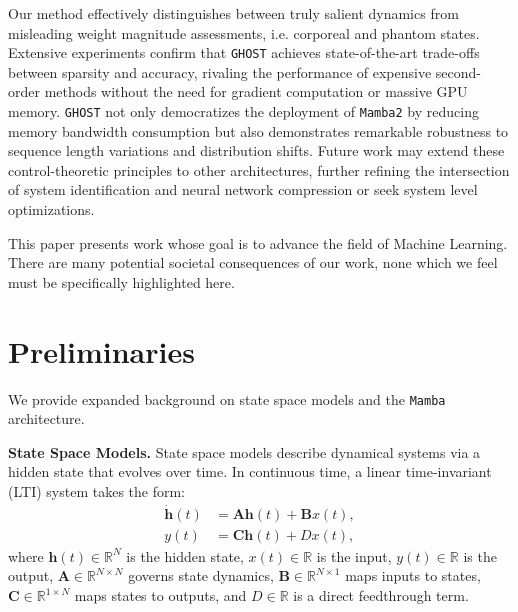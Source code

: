 \documentclass{article}
\theoremstyle{plain}
\theoremstyle{definition}
\theoremstyle{remark}
\begin{document}
Our method effectively distinguishes between truly salient dynamics from misleading weight magnitude assessments, i.e. corporeal and phantom states. Extensive experiments confirm that \texttt{GHOST} achieves state-of-the-art trade-offs between sparsity and accuracy, rivaling the performance of expensive second-order methods without the need for gradient computation or massive GPU memory. \texttt{GHOST} not only democratizes the deployment of \texttt{Mamba2} by reducing memory bandwidth consumption but also demonstrates remarkable robustness to sequence length variations and distribution shifts. Future work may extend these control-theoretic principles to other architectures, further refining the intersection of system identification and neural network compression or seek system level optimizations.


This paper presents work whose goal is to advance the field of Machine
Learning. There are many potential societal consequences of our work, none
which we feel must be specifically highlighted here.






\newpage
\appendix
\onecolumn
{}

\section{Preliminaries}
\label{app:preliminaries}
We provide expanded background on state space models and the \texttt{Mamba} architecture.

\textbf{State Space Models.}
State space models describe dynamical systems via a hidden state that evolves over time. In continuous time, a linear time-invariant (LTI) system takes the form:
\begin{align}
\dot{\bm{h}}(t) &= \bm{A}\bm{h}(t) + \bm{B}x(t), \label{eq:app_continuous_state} \\
y(t) &= \bm{C}\bm{h}(t) + D x(t), \label{eq:app_continuous_output}
\end{align}
where $\bm{h}(t) \in \mathbb{R}^N$ is the hidden state, $x(t) \in \mathbb{R}$ is the input, $y(t) \in \mathbb{R}$ is the output, $\bm{A} \in \mathbb{R}^{N \times N}$ governs state dynamics, $\bm{B} \in \mathbb{R}^{N \times 1}$ maps inputs to states, $\bm{C} \in \mathbb{R}^{1 \times N}$ maps states to outputs, and $D \in \mathbb{R}$ is a direct feedthrough term.
\end{document}
